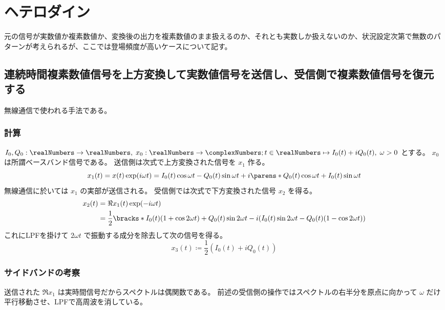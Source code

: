 \chapter{ヘテロダイン}
    元の信号が実数値か複素数値か、変換後の出力を複素数値のまま扱えるのか、それとも実数しか扱えないのか、状況設定次第で無数のパターンが考えられるが、ここでは登場頻度が高いケースについて記す。
    \section{連続時間複素数値信号を上方変換して実数値信号を送信し、受信側で複素数値信号を復元する}
        無線通信で使われる手法である。
        \subsection{計算}
            $I_0, Q_0:\realNumbers\to\realNumbers,\;x_0:\realNumbers\to\complexNumbers; t\in\realNumbers\mapsto I_0(t) + iQ_0(t),\;\omega > 0$ とする。
            $x_0$ は所謂ベースバンド信号である。
            送信側は次式で上方変換された信号を $x_1$ 作る。
            \[ x_1(t) = x(t)\exp(i\omega t) = I_0(t)\cos\omega t - Q_0(t)\sin\omega t + i\parens*{Q_0(t)\cos\omega t + I_0(t)\sin\omega t} \]
            無線通信に於いては $x_1$ の実部が送信される。
            受信側では次式で下方変換された信号 $x_2$ を得る。
            \begin{align*}
                x_2(t) &= \Re{x_1(t)}\exp(-i\omega t) \\
                &= \frac{1}{2}\bracks*{I_0(t)(1+\cos 2\omega t) + Q_0(t)\sin 2\omega t - i(I_0(t)\sin 2\omega t - Q_0(t)(1-\cos 2\omega t))}
            \end{align*}
            これにLPFを掛けて $2\omega t$ で振動する成分を除去して次の信号を得る。
            \[ x_3(t) \coloneqq \frac{1}{2}(I_0(t) + iQ_0(t)) \]
        \subsection{サイドバンドの考察}
            送信された $\Re{x_1}$ は実時間信号だからスペクトルは偶関数である。
            前述の受信側の操作ではスペクトルの右半分を原点に向かって $\omega$ だけ平行移動させ、LPFで高周波を消している。
